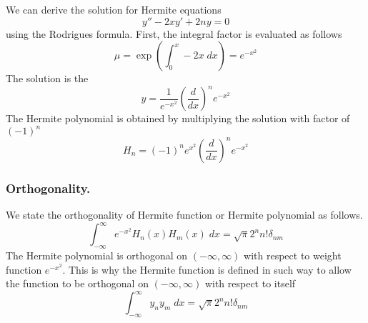 \documentclass[../main.tex]{subfiles}
\begin{document}
We can derive the solution for Hermite equations
\begin{equation*}
    y''-2xy'+2ny=0
\end{equation*}
using the Rodrigues formula. First, the integral factor is evaluated as follows 
\begin{equation*}
    \mu=\exp\left(\int_{0}^{x}-2x\;dx\right)=e^{-x^2}
\end{equation*}
The solution is the 
\begin{equation*}
    y=\frac{1}{e^{-x^2}}\left(\frac{d}{dx}\right)^ne^{-x^2}
\end{equation*}
The Hermite polynomial is obtained by multiplying the solution with factor of $(-1)^n$
\begin{equation*}
    H_n=(-1)^ne^{x^2}\left(\frac{d}{dx}\right)^ne^{-x^2}
\end{equation*} 

\subsubsection*{Orthogonality.} We state the orthogonality of Hermite function or Hermite polynomial as follows.
\begin{equation*}
    \int_{-\infty}^{\infty}e^{-x^2}H_n(x)H_m(x)\;dx=\sqrt{\pi}2^n n!\delta_{nm}
\end{equation*} 
The Hermite polynomial is orthogonal on $(-\infty,\infty)$ with respect to weight function $e^{-x^2}$. 
This is why the Hermite function is defined in such way to allow the function to be orthogonal on $(-\infty,\infty)$ with respect to itself
\begin{equation*}
    \int_{-\infty}^{\infty}y_ny_m\;dx=\sqrt{\pi}2^nn!\delta_{nm}
\end{equation*}
\end{document}
